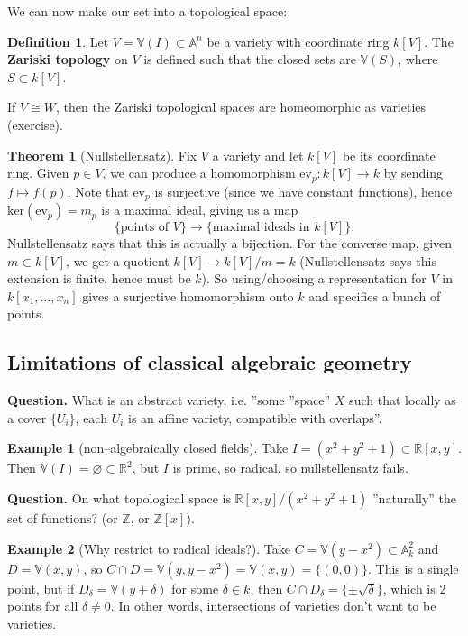 \documentclass{article}
\theoremstyle{definition}
\newtheorem{theorem}{Theorem}[section]
\newtheorem{example}{Example}[section]
\newtheorem{defn}{Definition}[section]
\begin{document}
We can now make our set into a topological space:
\begin{defn}
    Let $V = \mathbb{V}(I) \subset \mathbb{A}^n$ be a variety with coordinate ring $k[V]$. The \textbf{Zariski topology} on $V$ is defined such that the closed sets are $\mathbb{V}(S)$, where $S \subset k[V]$.
\end{defn}
If $V \cong W$, then the Zariski topological spaces are homeomorphic as varieties (exercise).

\begin{theorem}[Nullstellensatz]
    Fix $V$ a variety and let $k[V]$ be its coordinate ring. Given $p \in V$, we can produce a homomorphism $\text{ev}_p : k[V] \to k$ by sending $f \mapsto f(p)$. Note that $\text{ev}_p$ is surjective (since we have constant functions), hence $\text{ker}(\text{ev}_p) = m_p$ is a maximal ideal, giving us a map \[
        \{\text{points of }V\} \rightarrow \{\text{maximal ideals in }k[V]\}.
    \]
    Nullstellensatz says that this is actually a bijection. For the converse map, given $m \subset k[V]$, we get a quotient $k[V] \to k[V]/m = k$ (Nullstellensatz says this extension is finite, hence must be $k$). So using/choosing a representation for $V$ in $k[x_1,\ldots,x_n]$ gives a surjective homomorphism onto $k$ and specifies a bunch of points.
\end{theorem}
\subsection{Limitations of classical algebraic geometry}
\textbf{Question.} What is an abstract variety, i.e. ''some ''space'' $X$ such that  locally as a cover $\{U_i\}$, each $U_i$ is an affine variety, compatible with overlaps''. 

\begin{example}[non--algebraically closed fields]
    Take $I = (x^2+y^2+1) \subset \mathbb{R}[x,y]$. Then $\mathbb{V}(I) = \varnothing \subset \mathbb{R}^2$, but $I$ is prime, so radical, so nullstellensatz fails.
\end{example}

\textbf{Question.} On what topological space is $\mathbb{R}[x,y]/(x^2+y^2+1)$ ''naturally'' the set of functions? (or $\mathbb{Z}$, or $\mathbb{Z}[x]$).

\begin{example}[Why restrict to radical ideals?]
    Take $C = \mathbb{V}(y-x^2) \subset \mathbb{A}_k^2$ and $D = \mathbb{V}(x,y)$, so $C \cap D = \mathbb{V}(y, y-x^2) = \mathbb{V}(x,y) = \{(0,0)\}$. This is a single point, but if $D_\delta = \mathbb{V}(y+\delta)$ for some $\delta \in k$, then $C \cap D_\delta = \{\pm \sqrt{\delta}\}$, which is 2 points for all $\delta \neq 0$. In other words, intersections of varieties don't want to be varieties.
\end{example}
\end{document}

